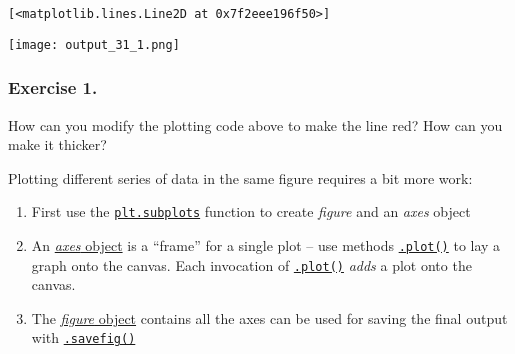 \documentclass[english,serif,mathserif,xcolor=pdftex,dvipsnames,table]{beamer}
\begin{document}
\begin{verbatim}
[<matplotlib.lines.Line2D at 0x7f2eee196f50>]
\end{verbatim}

\texttt{[image: output\_31\_1.png]}

\subsubsection{Exercise 1.}\label{exercise-1.}

How can you modify the plotting code above to make the line red? How can
you make it thicker?

\begin{Shaded}
\begin{Highlighting}[]
\end{Highlighting}
\end{Shaded}

Plotting different series of data in the same figure requires a bit more
work:

\begin{enumerate}
\tightlist
\item
  First use the
  \href{http://matplotlib.org/api/pyplot_api.html\#matplotlib.pyplot.subplots}{\texttt{plt.subplots}}
  function to create \emph{figure} and an \emph{axes} object
\item
  An
  \href{http://matplotlib.org/api/axes_api.html\#matplotlib.axes.Axes}{\emph{axes}
  object} is a ``frame'' for a single plot -- use methods
  \href{http://matplotlib.org/api/_as_gen/matplotlib.axes.Axes.plot.html\#matplotlib.axes.Axes.plot}{\texttt{.plot()}}
  to lay a graph onto the canvas. Each invocation of
  \href{http://matplotlib.org/api/_as_gen/matplotlib.axes.Axes.plot.html\#matplotlib.axes.Axes.plot}{\texttt{.plot()}}
  \emph{adds} a plot onto the canvas.
\item
  The
  \href{http://matplotlib.org/api/figure_api.html\#matplotlib.figure.Figure}{\emph{figure}
  object} contains all the axes can be used for saving the final output
  with
  \href{http://matplotlib.org/api/figure_api.html\#matplotlib.figure.Figure.savefig}{\texttt{.savefig()}}
\end{enumerate}

\begin{Shaded}
\begin{Highlighting}[]
\OperatorTok{=} \NormalTok{, }\OperatorTok{=}\NormalTok{[}\NormalTok{, }\NormalTok{])}

\end{Highlighting}
\end{Shaded}
\end{document}
